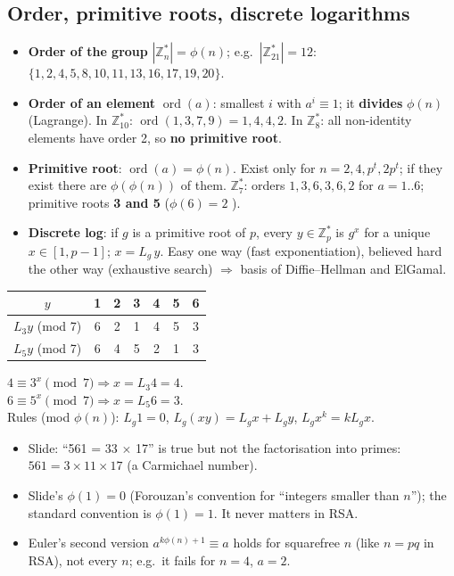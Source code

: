 \subsection{Order, primitive roots, discrete logarithms}
\begin{itemize}
  \item \textbf{Order of the group} $|\mathbb{Z}_n^*| = \phi(n)$; e.g.\ $|\mathbb{Z}_{21}^*| = 12$: $\{1, 2, 4, 5, 8, 10, 11, 13, 16, 17, 19, 20\}$.
  \item \textbf{Order of an element} $\operatorname{ord}(a)$: smallest $i$ with $a^i \equiv 1$; it \textbf{divides} $\phi(n)$ (Lagrange). In $\mathbb{Z}_{10}^*$: $\operatorname{ord}(1, 3, 7, 9) = 1, 4, 4, 2$. In $\mathbb{Z}_8^*$: all non-identity elements have order 2, so \textbf{no primitive root}.
  \item \textbf{Primitive root}: $\operatorname{ord}(a) = \phi(n)$. Exist only for $n = 2, 4, p^t, 2p^t$; if they exist there are $\phi(\phi(n))$ of them. $\mathbb{Z}_7^*$: orders $1, 3, 6, 3, 6, 2$ for $a = 1..6$; primitive roots \textbf{3 and 5} ($\phi(6) = 2$ \checkmark).
  \item \textbf{Discrete log}: if $g$ is a primitive root of $p$, every $y \in \mathbb{Z}_p^*$ is $g^x$ for a unique $x \in [1, p-1]$; $x = L_g\, y$. Easy one way (fast exponentiation), believed hard the other way (exhaustive search) $\Rightarrow$ basis of Diffie--Hellman and ElGamal.
\end{itemize}
\begin{center}\small
\begin{tabular}{@{}c|cccccc@{}}
$y$ & 1&2&3&4&5&6\\ \midrule
$L_3 y$ (mod 7) & 6&2&1&4&5&3\\
$L_5 y$ (mod 7) & 6&4&5&2&1&3\\
\end{tabular}
\qquad
\begin{minipage}{0.45\textwidth}\small
$4 \equiv 3^x \pmod 7 \Rightarrow x = L_3 4 = 4$.\\
$6 \equiv 5^x \pmod 7 \Rightarrow x = L_5 6 = 3$.\\
Rules (mod $\phi(n)$): $L_g 1 = 0$, \;$L_g(xy) = L_g x + L_g y$, \;$L_g x^k = k L_g x$.
\end{minipage}
\end{center}

\begin{fixbox}
\begin{itemize}
  \item Slide: ``561 = 33 $\times$ 17'' is true but not the factorisation into primes: $561 = 3 \times 11 \times 17$ (a Carmichael number).
  \item Slide's $\phi(1) = 0$ (Forouzan's convention for ``integers smaller than $n$''); the standard convention is $\phi(1) = 1$. It never matters in RSA.
  \item Euler's second version $a^{k\phi(n)+1} \equiv a$ holds for squarefree $n$ (like $n = pq$ in RSA), not every $n$; e.g.\ it fails for $n = 4$, $a = 2$.
\end{itemize}
\end{fixbox}
